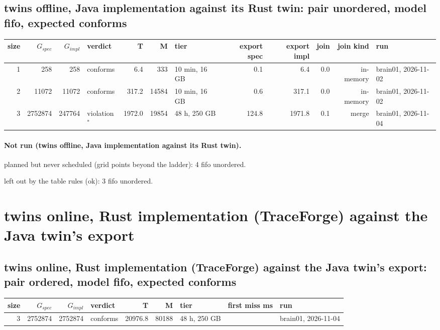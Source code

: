\documentclass[10pt]{article}
\begin{document}
\subsection*{twins offline, Java implementation against its Rust twin: pair \textsf{unordered}, model fifo, expected conforms}
\begin{longtable}{@{}rrrlrrlrrrrl@{}}
\toprule
size & $G_{\mathit{spec}}$ & $G_{\mathit{impl}}$ & verdict & T & M & tier & export spec & export impl & join & join kind & run \\
\midrule
\endhead
\color{red} 1 & 258 & 258 & conforms & 6.4 & 333 & 10 min, 16 GB & 0.1 & 6.4 & 0.0 & in-memory & brain01, 2026-11-02 \\
\color{red} 2 & 11072 & 11072 & conforms & 317.2 & 14584 & 10 min, 16 GB & 0.6 & 317.1 & 0.0 & in-memory & brain01, 2026-11-02 \\
\color{blue} 3 & 2752874 & 247764 & violation$^{\ast}$ & 1972.0 & 19854 & 48 h, 250 GB & 124.8 & 1971.8 & 0.1 & merge & brain01, 2026-11-04 \\
\bottomrule
\end{longtable}
\paragraph{Not run (twins offline, Java implementation against its Rust twin).}
planned but never scheduled (grid points beyond the ladder): 4 fifo unordered.\par
left out by the table rules (ok): 3 fifo unordered.\par
\section*{twins online, Rust implementation (TraceForge) against the Java twin's export}
\subsection*{twins online, Rust implementation (TraceForge) against the Java twin's export: pair \textsf{ordered}, model fifo, expected conforms}
\begin{longtable}{@{}rrrlrrlrl@{}}
\toprule
size & $G_{\mathit{spec}}$ & $G_{\mathit{impl}}$ & verdict & T & M & tier & first miss ms & run \\
\midrule
\endhead
\color{blue} 3 & 2752874 & 2752874 & conforms & 20976.8 & 80188 & 48 h, 250 GB &  & brain01, 2026-11-04 \\
\bottomrule
\end{longtable}
\end{document}
